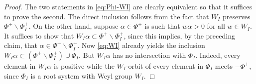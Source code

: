 \documentclass[12pt]{amsart}
\theoremstyle{remark}
\begin{document}
\begin{proof}
The two statements in \eqref{eq:Phi-WI} are clearly equivalent so that it suffices to prove the second.  The direct inclusion follows from the fact that $W_I$ preserves $\Phi^+ \smallsetminus \Phi_I^+$. On the other hand, suppose $\alpha \in \Phi^+$ is such that $w \alpha > 0$ for all $w \in W_I$. It suffices to show that $W_I \alpha \subset \Phi^+ \smallsetminus \Phi_I^+$, since this implies, by the preceding claim, that $\alpha \in \Phi^+ \smallsetminus \Phi_I^+$. Now \eqref{eq:WI} already yields the inclusion $W_I \alpha\subset(\Phi^+ \smallsetminus \Phi_I^+) \cup \Phi_I$. But $W_I\alpha$ has no intersection with $\Phi_I$. Indeed, every element in $W_I\alpha$ is positive while the $W_I$-orbit of every element in $\Phi_I$ meets $-\Phi^+$, since $\Phi_I$ is a root system with Weyl group $W_I$.
%
%
%

\end{proof}
\end{document}
